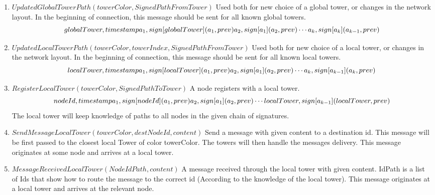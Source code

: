 \documentclass{amsart}
\theoremstyle{definition}
\theoremstyle{remark}
\numberwithin{equation}{section}
\begin{document}
\begin{enumerate}
  \item $UpdatedGlobalTowerPath(towerColor, SignedPathFromTower)$
      Used both for new choice of a global tower, or changes in the network layout.
      In the beginning of connection, this message should be sent for all known
      global towers. 
      \[
        globalTower,  timestamp                     \\
        a_1,          sign[globalTower](a_1, prev)  \\
        a_2,          sign[a_1](a_2, prev)          \\
        \cdots                                      \\
        a_k,          sign[a_k](a_{k-1}, prev)
      \]

  \item $UpdatedLocalTowerPath(towerColor, towerIndex, SignedPathFromTower)$
      Used both for new choice of a local tower, or changes in the network
      layout. In the beginning of connection, this message should be sent for
      all known local towers. 
      \[
        localTower,   timestamp                     \\
        a_1,          sign[localTower](a_1, prev)   \\
        a_2,          sign[a_1](a_2, prev)          \\
        \cdots                                      \\
        a_k,          sign[a_{k-1}](a_k, prev)
      \]

  \item $RegisterLocalTower(towerColor, SignedPathToTower)$
      A node registers with a local tower.
      \[
        nodeId,       timestamp                   \\
        a_1,          sign[nodeId](a_1, prev)    \\
        a_2,          sign[a_1](a_2, prev)        \\
        \cdots                                    \\
        localTower,   sign[a_{k-1}](localTower, prev)
      \]
      The local tower will keep knowledge of paths to all nodes in the given
      chain of signatures.


  \item $SendMessageLocalTower(towerColor, destNodeId, content)$
    Send a message with given content to a destination id.
    This message will be first passed to the closest local Tower of color
    towerColor. The towers will then handle the messages delivery. This message
    originates at some node and arrives at a local tower.

  \item $MessageReceivedLocalTower(NodeIdPath, content)$
    A message received through the local tower with given content.
    IdPath is a list of Ids that show how to route the message to the correct
    id (According to the knowledge of the local tower).
    This message originates at a local tower and arrives at the relevant node.

\end{enumerate}
\end{document}
